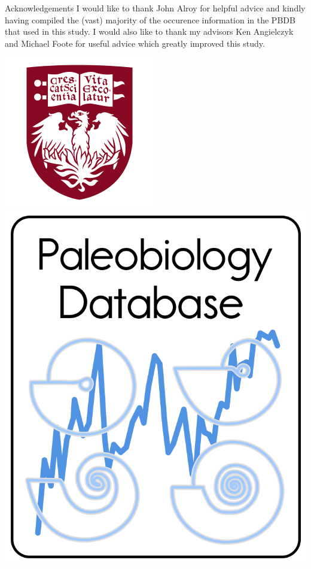 \documentclass[final]{beamer}\usepackage[]{graphicx}\usepackage[]{color}
\newlength{\onecolwid}
\begin{document}
\begin{frame}[t]
\begin{columns}[t]
\begin{columns}[t,totalwidth = \onecolwid]
\begin{column}{\onecolwid}
        \begin{scriptsize}
          \begin{block}{Acknowledgements}
            I would like to thank John Alroy for helpful advice and kindly having compiled the (vast) majority of the occurence information in the PBDB that used in this study. I would also like to thank my advisors Ken Angielczyk and Michael Foote for useful advice which greatly improved this study. 
            \begin{center}
              \includegraphics[height = 0.1\textheight]{figure/chicago}
              \includegraphics[height = 0.1\textheight]{figure/pbdb}
            \end{center}
          \end{block}
        \end{scriptsize}


\end{column}
\end{columns}
\end{columns}
\end{frame}
\end{document}
